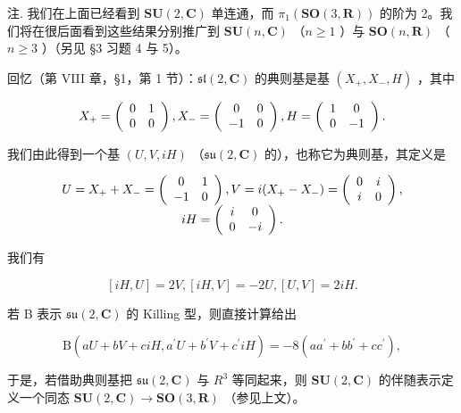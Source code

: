 注. 我们在上面已经看到 \(\mathbf{SU}(2,\mathbf{C})\) 单连通，而 \(\pi_{1}(\mathbf{SO}(3,\mathbf{R}))\) 的阶为 2。我们将在很后面看到这些结果分别推广到 \(\mathbf{SU}(n,\mathbf{C})\) （\(n\geq1\) ）与 \(\mathbf{SO}(n,\mathbf{R})\) （\(n\geq3\) ）（另见 §3 习题 4 与 5）。

回忆（第 VIII 章，§1，第 1 节）：\(\mathfrak{sl}(2,\mathbf{C})\) 的典则基是基 \((X_{+},X_{-},H)\) ，其中

\[
X _ {+} = \left( \begin{array}{c c} 0 & 1 \\ 0 & 0 \end{array} \right), X _ {-} = \left( \begin{array}{c c} 0 & 0 \\ - 1 & 0 \end{array} \right), H = \left( \begin{array}{c c} 1 & 0 \\ 0 & - 1 \end{array} \right).
\]

我们由此得到一个基 \((U, V, iH)\) （\(\mathfrak{su}(2, \mathbf{C})\) 的），也称它为典则基，其定义是

\[
\begin{array}{c} U = X _ {+} + X _ {-} = \left( \begin{array}{c c} 0 & 1 \\ - 1 & 0 \end{array} \right), V = i (X _ {+} - X _ {-}) = \left( \begin{array}{c c} 0 & i \\ i & 0 \end{array} \right), \\ i H = \left( \begin{array}{c c} i & 0 \\ 0 & - i \end{array} \right). \end{array}
\]

我们有

\[
[ i H, U ] = 2 V, [ i H, V ] = - 2 U, [ U, V ] = 2 i H.\tag{13}
\]

若 B 表示 \(\mathfrak{su}(2,\mathbf{C})\) 的 Killing 型，则直接计算给出

\[
\mathrm{B} (a U + b V + c i H, a ^ {\prime} U + b ^ {\prime} V + c ^ {\prime} i H) = - 8 (a a ^ {\prime} + b b ^ {\prime} + c c ^ {\prime}),\tag{14}
\]

于是，若借助典则基把 \(\mathfrak{su}(2,\mathbf{C})\) 与 \(R^{3}\) 等同起来，则 \(\mathbf{SU}(2,\mathbf{C})\) 的伴随表示定义一个同态 \(\mathbf{SU}(2,\mathbf{C})\to\mathbf{SO}(3,\mathbf{R})\) （参见上文）。

